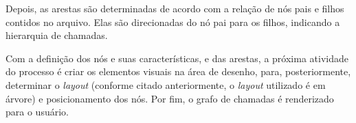 Depois, as arestas são determinadas de acordo com a relação de nós pais e filhos contidos no arquivo. Elas são direcionadas do nó pai para os filhos, indicando a hierarquia de chamadas.

Com a definição dos nós e suas características, e das arestas, a próxima atividade do processo é criar os elementos visuais na área de desenho, para, posteriormente, determinar o \textit{layout} (conforme citado anteriormente, o \textit{layout} utilizado é em árvore) e posicionamento dos nós. Por fim, o grafo de chamadas é renderizado para o usuário.






